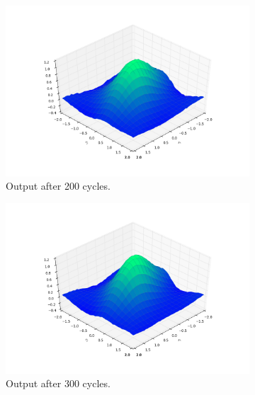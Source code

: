 \documentclass[a4paper,10pt]{article}
\numberwithin{equation}{section} %
\numberwithin{figure}{section} %
\numberwithin{table}{section} %
\theoremstyle{mytheor}
\begin{document}
\begin{enumerate}
\begin{figure}[h!]
\begin{subfigure}[b]{0.45\textwidth}
				\includegraphics[width=\textwidth]{plot/ex2_6_200.png}\vspace{-0.5cm}
				\caption{Output after 200 cycles.}
			\end{subfigure}
			\begin{subfigure}[b]{0.45\textwidth}
				\includegraphics[width=\textwidth]{plot/ex2_6_300.png}\vspace{-0.5cm}
				\caption{Output after 300 cycles.}
			\end{subfigure}
			\begin{subfigure}[b]{0.45\textwidth}

\end{subfigure}
\end{figure}
\end{enumerate}
\end{document}

